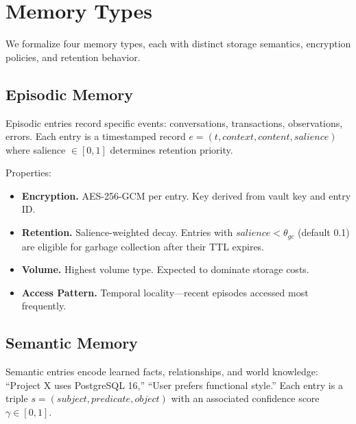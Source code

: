 \section{Memory Types}

\label{sec:types}

We formalize four memory types, each with distinct storage semantics, encryption policies, and retention behavior.

\subsection{Episodic Memory}

\begin{definition}
Episodic entries record specific events: conversations, transactions, observations, errors. Each entry is a timestamped record $e = (t, \textit{context}, \textit{content}, \textit{salience})$ where salience $\in [0, 1]$ determines retention priority.
\end{definition}

Properties:
\begin{itemize}
    \item \textbf{Encryption.} AES-256-GCM per entry. Key derived from vault key and entry ID.
    \item \textbf{Retention.} Salience-weighted decay. Entries with $\textit{salience} < \theta_{\textit{gc}}$ (default 0.1) are eligible for garbage collection after their TTL expires.
    \item \textbf{Volume.} Highest volume type. Expected to dominate storage costs.
    \item \textbf{Access Pattern.} Temporal locality---recent episodes accessed most frequently.
\end{itemize}

\subsection{Semantic Memory}

\begin{definition}
Semantic entries encode learned facts, relationships, and world knowledge: ``Project X uses PostgreSQL 16,'' ``User prefers functional style.'' Each entry is a triple $s = (\textit{subject}, \textit{predicate}, \textit{object})$ with an associated confidence score $\gamma \in [0, 1]$.
\end{definition}

